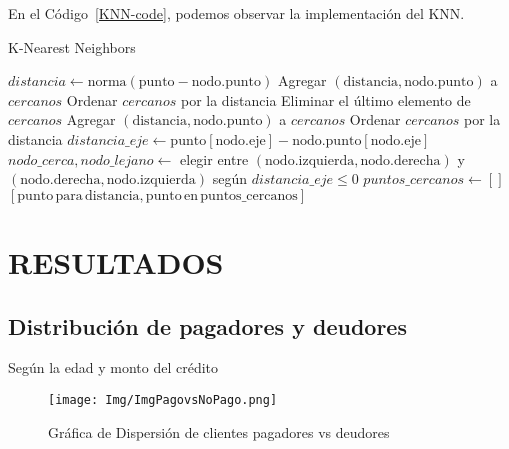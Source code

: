 \documentclass{article}
\begin{document}
\begin{sloppypar}
En el Código~\ref{KNN-code}, podemos observar la implementación del KNN.
\begin{algorithm}[H]
\caption{K-Nearest Neighbors}
\label{KNN-code}
\begin{algorithmic}
            \State \Return
        \EndIf
        \State $distancia \gets \text{norma}(\text{punto} - \text{nodo.punto})$
            \State Agregar $(\text{distancia}, \text{nodo.punto})$ a $cercanos$
            \State Ordenar $cercanos$ por la distancia
            \State Eliminar el último elemento de $cercanos$
            \State Agregar $(\text{distancia}, \text{nodo.punto})$ a $cercanos$
            \State Ordenar $cercanos$ por la distancia
        \EndIf
        \State $distancia\_eje \gets \text{punto}[\text{nodo.eje}] - \text{nodo.punto}[\text{nodo.eje}]$
        \State $nodo\_cerca, nodo\_lejano \gets$ elegir entre $(\text{nodo.izquierda}, \text{nodo.derecha})$ y $(\text{nodo.derecha}, \text{nodo.izquierda})$ según $distancia\_eje \leq 0$
        \State {}
            \State {}
        \EndIf
    \EndFunction    
    \State $puntos\_cercanos \gets []$
    \State {}
    \State \Return $[\text{punto} \, \text{para} \, \text{distancia}, \text{punto} \, \text{en} \, \text{puntos\_cercanos}]$
\EndFunction
\end{algorithmic}
\end{algorithm}


\section{RESULTADOS}
\vspace{0.5cm}
\subsection{Distribución de pagadores y deudores} Según la edad y monto del crédito
    \begin{figure}[H]
    \centering
    \texttt{[image: Img/ImgPagovsNoPago.png]}    \caption{\label{fig:PagadoresDeudores}Gráfica de Dispersión de clientes pagadores vs deudores}
    \end{figure}
\vspace{0.5cm}

\end{sloppypar}
\end{document}
